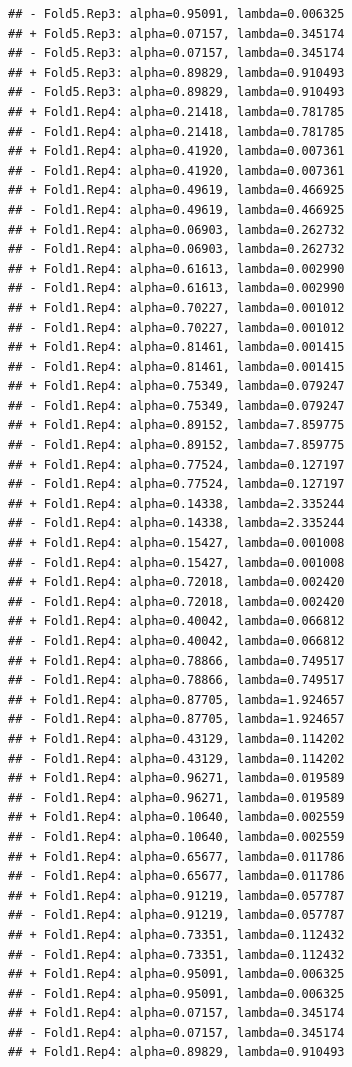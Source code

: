 \documentclass[
]{article}
\begin{document}
\begin{verbatim}
## - Fold5.Rep3: alpha=0.95091, lambda=0.006325 
## + Fold5.Rep3: alpha=0.07157, lambda=0.345174 
## - Fold5.Rep3: alpha=0.07157, lambda=0.345174 
## + Fold5.Rep3: alpha=0.89829, lambda=0.910493 
## - Fold5.Rep3: alpha=0.89829, lambda=0.910493 
## + Fold1.Rep4: alpha=0.21418, lambda=0.781785 
## - Fold1.Rep4: alpha=0.21418, lambda=0.781785 
## + Fold1.Rep4: alpha=0.41920, lambda=0.007361 
## - Fold1.Rep4: alpha=0.41920, lambda=0.007361 
## + Fold1.Rep4: alpha=0.49619, lambda=0.466925 
## - Fold1.Rep4: alpha=0.49619, lambda=0.466925 
## + Fold1.Rep4: alpha=0.06903, lambda=0.262732 
## - Fold1.Rep4: alpha=0.06903, lambda=0.262732 
## + Fold1.Rep4: alpha=0.61613, lambda=0.002990 
## - Fold1.Rep4: alpha=0.61613, lambda=0.002990 
## + Fold1.Rep4: alpha=0.70227, lambda=0.001012 
## - Fold1.Rep4: alpha=0.70227, lambda=0.001012 
## + Fold1.Rep4: alpha=0.81461, lambda=0.001415 
## - Fold1.Rep4: alpha=0.81461, lambda=0.001415 
## + Fold1.Rep4: alpha=0.75349, lambda=0.079247 
## - Fold1.Rep4: alpha=0.75349, lambda=0.079247 
## + Fold1.Rep4: alpha=0.89152, lambda=7.859775 
## - Fold1.Rep4: alpha=0.89152, lambda=7.859775 
## + Fold1.Rep4: alpha=0.77524, lambda=0.127197 
## - Fold1.Rep4: alpha=0.77524, lambda=0.127197 
## + Fold1.Rep4: alpha=0.14338, lambda=2.335244 
## - Fold1.Rep4: alpha=0.14338, lambda=2.335244 
## + Fold1.Rep4: alpha=0.15427, lambda=0.001008 
## - Fold1.Rep4: alpha=0.15427, lambda=0.001008 
## + Fold1.Rep4: alpha=0.72018, lambda=0.002420 
## - Fold1.Rep4: alpha=0.72018, lambda=0.002420 
## + Fold1.Rep4: alpha=0.40042, lambda=0.066812 
## - Fold1.Rep4: alpha=0.40042, lambda=0.066812 
## + Fold1.Rep4: alpha=0.78866, lambda=0.749517 
## - Fold1.Rep4: alpha=0.78866, lambda=0.749517 
## + Fold1.Rep4: alpha=0.87705, lambda=1.924657 
## - Fold1.Rep4: alpha=0.87705, lambda=1.924657 
## + Fold1.Rep4: alpha=0.43129, lambda=0.114202 
## - Fold1.Rep4: alpha=0.43129, lambda=0.114202 
## + Fold1.Rep4: alpha=0.96271, lambda=0.019589 
## - Fold1.Rep4: alpha=0.96271, lambda=0.019589 
## + Fold1.Rep4: alpha=0.10640, lambda=0.002559 
## - Fold1.Rep4: alpha=0.10640, lambda=0.002559 
## + Fold1.Rep4: alpha=0.65677, lambda=0.011786 
## - Fold1.Rep4: alpha=0.65677, lambda=0.011786 
## + Fold1.Rep4: alpha=0.91219, lambda=0.057787 
## - Fold1.Rep4: alpha=0.91219, lambda=0.057787 
## + Fold1.Rep4: alpha=0.73351, lambda=0.112432 
## - Fold1.Rep4: alpha=0.73351, lambda=0.112432 
## + Fold1.Rep4: alpha=0.95091, lambda=0.006325 
## - Fold1.Rep4: alpha=0.95091, lambda=0.006325 
## + Fold1.Rep4: alpha=0.07157, lambda=0.345174 
## - Fold1.Rep4: alpha=0.07157, lambda=0.345174 
## + Fold1.Rep4: alpha=0.89829, lambda=0.910493 

\end{verbatim}
\end{document}
